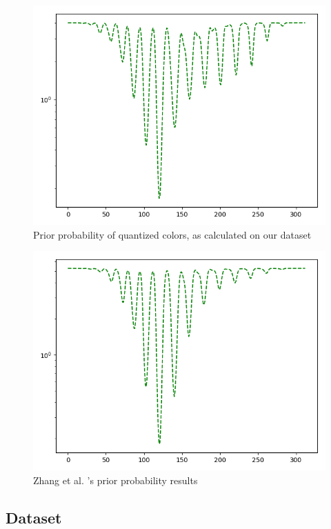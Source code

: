 \documentclass[twoside,twocolumn]{article}
\begin{document}
\begin{figure} [h]
	\includegraphics[width=\linewidth]{img/ours.png}
	\caption{Prior probability of quantized colors, as calculated on our dataset}
	\label{fig:oursprior}
\end{figure}

\begin{figure} [h]
	\includegraphics[width=\linewidth]{img/zhang.png}
	\caption{Zhang et al. \cite{Zhang:github}'s prior probability results}
	\label{fig:zhangprior}
\end{figure}

\subsection{Dataset}
\end{document}
